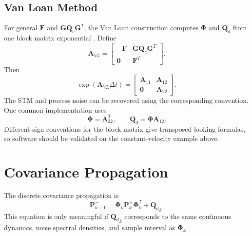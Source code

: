 \documentclass[11pt,oneside]{book}
\newcommand{\Ph}{\boldsymbol{\Phi}}
\newcommand{\Qd}{\mathbf{Q}_d}
\newcommand{\Qc}{\mathbf{Q}_c}
\newcommand{\zero}{\mathbf{0}}
\begin{document}
\subsection{Van Loan Method}
For general $\mathbf{F}$ and $\mathbf{G}\Qc\mathbf{G}^T$, the Van Loan construction computes $\Ph$ and $\Qd$ from one block matrix exponential \cite{vanloan1978}. Define
\begin{equation}
\mathbf{A}_{VL}=\begin{bmatrix}
-\mathbf{F} & \mathbf{G}\Qc\mathbf{G}^T\\
\zero & \mathbf{F}^T
\end{bmatrix}.
\end{equation}
Then
\begin{equation}
\exp(\mathbf{A}_{VL}\Delta t)=\begin{bmatrix}
\mathbf{A}_{11} & \mathbf{A}_{12}\\
\zero & \mathbf{A}_{22}
\end{bmatrix}.
\end{equation}
The STM and process noise can be recovered using the corresponding convention. One common implementation uses
\begin{equation}
\Ph=\mathbf{A}_{22}^T,
\qquad
\Qd=\Ph\mathbf{A}_{12}.
\end{equation}
Different sign conventions for the block matrix give transposed-looking formulas, so software should be validated on the constant-velocity example above.

\section{Covariance Propagation}
The discrete covariance propagation is
\begin{equation}
\mathbf{P}_{k+1}^- = {\Ph}_k\mathbf{P}_{k}^+{\Ph}_k^T+{\Qd}_k.
\label{eq:cov_prop_rev2}
\end{equation}
This equation is only meaningful if ${\Qd}_k$ corresponds to the same continuous dynamics, noise spectral densities, and sample interval as ${\Ph}_k$.
\end{document}
